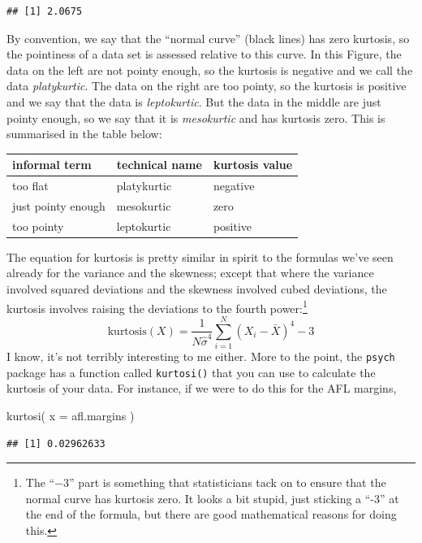 \documentclass[
]{book}
\newenvironment{Shaded}{\begin{snugshade}}{\end{snugshade}}
\newcommand{\AttributeTok}[1]{\textcolor[rgb]{0.77,0.63,0.00}{#1}}
\newcommand{\FunctionTok}[1]{\textcolor[rgb]{0.00,0.00,0.00}{#1}}
\newcommand{\NormalTok}[1]{#1}
\begin{document}
\begin{verbatim}
## [1] 2.0675
\end{verbatim}

By convention, we say that the ``normal curve'' (black lines) has zero kurtosis, so the pointiness of a data set is assessed relative to this curve. In this Figure, the data on the left are not pointy enough, so the kurtosis is negative and we call the data \emph{platykurtic}. The data on the right are too pointy, so the kurtosis is positive and we say that the data is \emph{leptokurtic}. But the data in the middle are just pointy enough, so we say that it is \emph{mesokurtic} and has kurtosis zero. This is summarised in the table below:

\begin{tabular}{lll}
\toprule
informal term & technical name & kurtosis value\\
\midrule
too flat & platykurtic & negative\\
just pointy enough & mesokurtic & zero\\
too pointy & leptokurtic & positive\\
\bottomrule
\end{tabular}

The equation for kurtosis is pretty similar in spirit to the formulas we've seen already for the variance and the skewness; except that where the variance involved squared deviations and the skewness involved cubed deviations, the kurtosis involves raising the deviations to the fourth power:\footnote{The ``\(-3\)'' part is something that statisticians tack on to ensure that the normal curve has kurtosis zero. It looks a bit stupid, just sticking a ``-3'' at the end of the formula, but there are good mathematical reasons for doing this.}
\[
\mbox{kurtosis}(X) = \frac{1}{N \hat\sigma^4} \sum_{i=1}^N \left( X_i - \bar{X} \right)^4  - 3
\]
I know, it's not terribly interesting to me either. More to the point, the \texttt{psych} package has a function called \texttt{kurtosi()} that you can use to calculate the kurtosis of your data. For instance, if we were to do this for the AFL margins,

\begin{Shaded}
\begin{Highlighting}[]
\FunctionTok{kurtosi}\NormalTok{( }\AttributeTok{x =}\NormalTok{ afl.margins )}
\end{Highlighting}
\end{Shaded}

\begin{verbatim}
## [1] 0.02962633
\end{verbatim}
\end{document}
